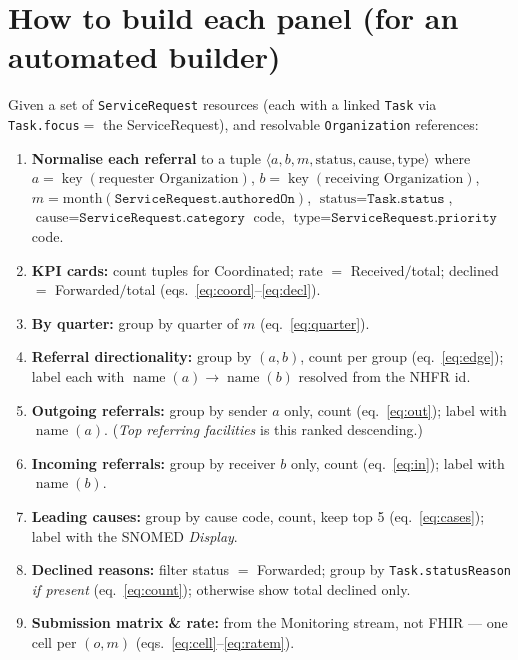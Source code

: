 \documentclass[11pt]{article}
\newcommand{\key}{\operatorname{key}}
\newcommand{\name}{\operatorname{name}}
\newcommand{\fhir}[1]{\texttt{#1}}
\begin{document}
\section{How to build each panel (for an automated builder)}
Given a set of \fhir{ServiceRequest} resources (each with a linked \fhir{Task} via \fhir{Task.focus}$=$ the ServiceRequest), and resolvable \fhir{Organization} references:
\begin{enumerate}
  \item \textbf{Normalise each referral} to a tuple $\langle a,b,m,\text{status},\text{cause},\text{type}\rangle$ where $a=\key(\text{requester Organization})$, $b=\key(\text{receiving Organization})$, $m=\text{month}(\fhir{ServiceRequest.authoredOn})$, $\text{status}=\fhir{Task.status}$, $\text{cause}=\fhir{ServiceRequest.category}$ code, $\text{type}=\fhir{ServiceRequest.priority}$ code.
  \item \textbf{KPI cards:} count tuples for Coordinated; rate $=$ Received$/$total; declined $=$ Forwarded$/$total (eqs.~\ref{eq:coord}--\ref{eq:decl}).
  \item \textbf{By quarter:} group by quarter of $m$ (eq.~\ref{eq:quarter}).
  \item \textbf{Referral directionality:} group by $(a,b)$, count per group (eq.~\ref{eq:edge}); label each with $\name(a)\!\to\!\name(b)$ resolved from the NHFR id.
  \item \textbf{Outgoing referrals:} group by sender $a$ only, count (eq.~\ref{eq:out}); label with $\name(a)$. (\emph{Top referring facilities} is this ranked descending.)
  \item \textbf{Incoming referrals:} group by receiver $b$ only, count (eq.~\ref{eq:in}); label with $\name(b)$.
  \item \textbf{Leading causes:} group by cause code, count, keep top 5 (eq.~\ref{eq:cases}); label with the SNOMED \emph{Display}.
  \item \textbf{Declined reasons:} filter status $=$ Forwarded; group by \fhir{Task.statusReason} \emph{if present} (eq.~\ref{eq:count}); otherwise show total declined only.
  \item \textbf{Submission matrix \& rate:} from the Monitoring stream, not FHIR --- one cell per $(o,m)$ (eqs.~\ref{eq:cell}--\ref{eq:ratem}).
\end{enumerate}
\end{document}
